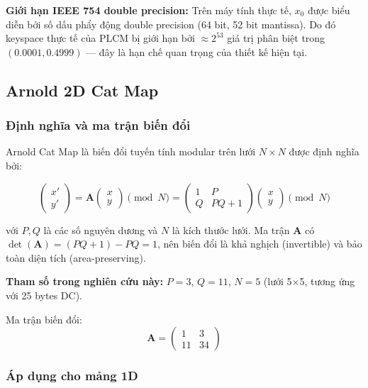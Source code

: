 \textbf{Giới hạn IEEE 754 double precision:}
Trên máy tính thực tế, $x_0$ được biểu diễn bởi số dấu phẩy động double precision
(64 bit, 52 bit mantissa). Do đó keyspace thực tế của PLCM bị giới hạn bởi
$\approx 2^{53}$ giá trị phân biệt trong $(0.0001, 0.4999)$ --- đây là hạn chế
quan trọng của thiết kế hiện tại.

\subsection{Arnold 2D Cat Map}

\subsubsection{Định nghĩa và ma trận biến đổi}

Arnold Cat Map \cite{arnold_catmap} là biến đổi tuyến tính modular trên lưới
$N \times N$ được định nghĩa bởi:

\begin{equation}
\begin{pmatrix} x' \\ y' \end{pmatrix}
= \mathbf{A} \begin{pmatrix} x \\ y \end{pmatrix} \pmod{N}
= \begin{pmatrix} 1 & P \\ Q & PQ+1 \end{pmatrix}
\begin{pmatrix} x \\ y \end{pmatrix} \pmod{N}
\label{eq:arnold}
\end{equation}

với $P, Q$ là các số nguyên dương và $N$ là kích thước lưới. Ma trận $\mathbf{A}$
có $\det(\mathbf{A}) = (PQ+1) - PQ = 1$, nên biến đổi là khả nghịch (invertible)
và bảo toàn diện tích (area-preserving).

\textbf{Tham số trong nghiên cứu này:} $P = 3$, $Q = 11$, $N = 5$ (lưới 5$\times$5,
tương ứng với 25 bytes DC).

Ma trận biến đổi:
\begin{equation}
\mathbf{A} = \begin{pmatrix} 1 & 3 \\ 11 & 34 \end{pmatrix}
\end{equation}

\subsubsection{Áp dụng cho mảng 1D}

